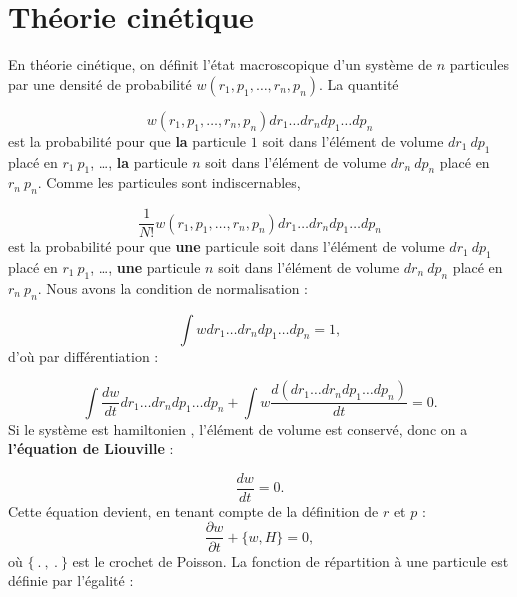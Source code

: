 \documentclass{book}
\begin{document}
\section{Th\'eorie cin\'etique}
En th\'eorie 
cin\'etique, on d\'efinit l'\'etat
macroscopique d'un 
syst\`eme de $n$ particules par une densit\'e de probabilit\'e
$w(r_1,p_1,\dots,r_n,p_n)$. La quantit\'e 

\begin{equation}
w(r_1,p_1,\dots,r_n,p_n)d r_1\dots d r_n d p_1\dots d p_n
\end{equation}
est la probabilit\'e pour que {\bf la} particule $1$ soit dans
l'\'el\'ement de volume 
$dr_1\ dp_1$ plac\'e en $r_1\ p_1$, \dots, {\bf la} particule $n$ soit
dans l'\'el\'ement de volume $dr_n\ dp_n$ plac\'e en $r_n\ p_n$.
Comme les particules sont indiscernables,


\begin{equation}
\frac{1}{N!}w(r_1,p_1,\dots,r_n,p_n)d r_1\dots d r_n d p_1\dots d p_n
\end{equation}
est la probabilit\'e pour que {\bf une} particule  soit dans
l'\'el\'ement de volume 
$dr_1\ dp_1$ plac\'e en $r_1\ p_1$, \dots, {\bf une} particule $n$
soit dans 
l'\'el\'ement de volume 
$dr_n\ dp_n$ plac\'e en $r_n\ p_n$.
Nous avons la condition de normalisation :

\begin{equation}
\int w d r_1\dots d r_n d p_1\dots d p_n=1,
\end{equation}
d'o\`u par diff\'erentiation :

\begin{equation}
\int \frac{d w}{dt} d r_1\dots d r_n d p_1\dots d p_n+\int w\frac{d (d
r_1\dots d r_n d p_1\dots d p_n)}{dt}=0. 
\end{equation}
Si le syst\`eme est hamiltonien , l'\'el\'ement de volume est
conserv\'e, donc 
on a {\bf l'\'equation de Liouville} :

\begin{equation}
\frac{d w}{dt}=0.
\end{equation}
Cette \'equation devient, en tenant compte de la d\'efinition de $r$ et
$p$ : 
\begin{equation}
\frac{\partial w}{\partial t}+\{w,H\}=0,
\end{equation}
o\`u $\{\ .\ ,\ .\ \}$ est le crochet de Poisson.
La fonction de r\'epartition
\`a une particule est d\'efinie par
l'\'egalit\'e :
\end{document}
